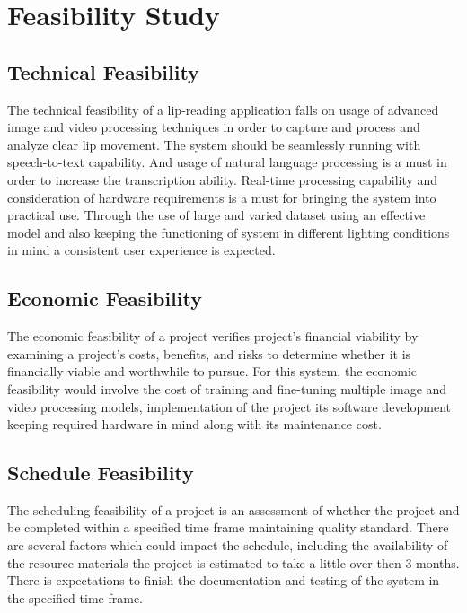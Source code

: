     \chapter{Feasibility Study}
        \section{Technical Feasibility}

The technical feasibility of a lip-reading application falls on usage of advanced image and video processing techniques in order to capture and process and analyze clear lip movement. The system should be seamlessly running with speech-to-text capability. And usage of natural language processing is a must in order to increase the transcription ability.  Real-time processing capability and consideration of hardware requirements is a must for bringing the system into practical use. Through the use of large and varied dataset using an effective model and also keeping the functioning of system in different lighting conditions in mind a consistent user experience is expected.

\section{Economic Feasibility}

The economic feasibility of a project verifies project's financial viability by examining a project's costs, benefits, and risks to determine whether it is financially viable and worthwhile to pursue.
For this system, the economic feasibility would involve the cost of training and fine-tuning multiple image and video processing models, implementation of the project its software development keeping required hardware in mind along with its maintenance cost.

\section{Schedule Feasibility}

The scheduling feasibility of a project is an assessment of whether the project and be completed within a specified time frame maintaining quality standard. There are several factors which could impact the schedule, including the availability of the resource materials the project is estimated to take a little over then 3 months. There is expectations to finish the documentation and testing of the system in the specified time frame.